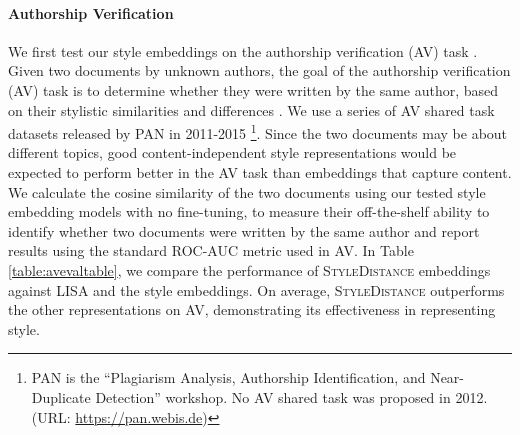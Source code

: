 \paragraph{Authorship Verification} We first test our style embeddings on the authorship verification (AV) task \citep{authorshipverification}. 
Given two documents by unknown authors, the goal of the authorship verification (AV) task is to determine whether they were written by the same author, based on their stylistic similarities and differences \citep{stylisticauthorshipverification}. We use a series of AV shared task datasets released by PAN in 2011-2015 \citep{pan11,pan13,pan14,pan15}\footnote{PAN is the ``Plagiarism Analysis, Authorship Identification, and Near-Duplicate Detection'' workshop. No AV shared task was proposed in 2012. (URL: \url{https://pan.webis.de})}. Since the two documents may be about different topics, good content-independent style representations would be expected to perform better in the AV task than embeddings that capture content. We calculate the cosine similarity of the two documents using our tested style embedding models with no fine-tuning, to measure their off-the-shelf ability to identify whether two documents were written by the same author and report results using the standard ROC-AUC metric used in AV. In Table \ref{table:avevaltable}, we compare the performance of \textsc{StyleDistance} embeddings against LISA and the \citet{styleemb} style embeddings. On average, \textsc{StyleDistance} outperforms the other representations on AV, demonstrating its effectiveness in representing style.

\avevaltable

